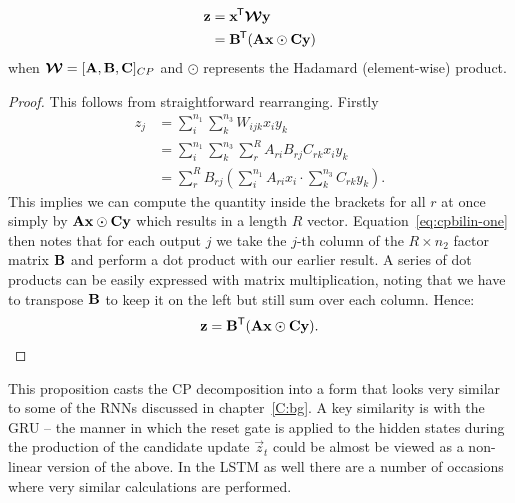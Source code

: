 \begin{prop} \label{prop:cpbilin}
\begin{align}
	\mathbf{z} &= \mathbf{x}^{\mkern-1.5mu\mathsf{T}}\bm{\mathcal{W}}\mathbf{y} \\
			&= \mathbf{B}^{\mkern-1.5mu\mathsf{T}}(\mathbf{A}\mathbf{x} \odot \mathbf{C}\mathbf{y})
\end{align}
when \(\bm{\mathcal{W}} = [\mathbf{A}, \mathbf{B}, \mathbf{C}]_{CP}\) and \(\odot\) represents the Hadamard
(element-wise) product.
\end{prop}
\begin{proof}
This follows from straightforward rearranging. Firstly
\begin{align}
	z_j &= \sum_{i}^{n_1} \sum_k^{n_3} W_{ijk} x_i y_k \\
		&= \sum_{i}^{n_1} \sum_k^{n_3} \sum_r^R A_{ri} B_{rj} C_{rk} x_i y_k\\\label{eq:cpbilin-one}
		&= \sum_r^R B_{rj} \left( \sum_i^{n_1} A_{ri} x_i \cdot \sum_k^{n_3} C_{rk}y_k \right).
\end{align}
This implies we can compute the quantity inside the brackets for all \(r\) at once simply
by \(\mathbf{A}\mathbf{x} \odot \mathbf{C}\mathbf{y}\) which results in a length \(R\) vector. 
Equation~\eqref{eq:cpbilin-one} then notes that for each output \(j\) we take the \(j\)-th column
of the \(R \times n_2\) factor matrix \(\mathbf{B}\) and perform a dot product with our earlier
result. A series of dot products can be easily expressed with matrix multiplication, noting
that we have to transpose \(\mathbf{B}\) to keep it on the left but still sum over each column.
Hence:
\begin{equation}
	\mathbf{z} = \mathbf{B}^\mathsf{T} (\mathbf{A}\mathbf{x} \odot \mathbf{C}\mathbf{y}).
\end{equation}
\end{proof}

This proposition casts the CP decomposition into a form that looks very similar to some of the
RNNs discussed in chapter~\ref{C:bg}. A key similarity is with the GRU -- the manner in which
the reset gate is applied to the hidden states during the production of the candidate update
\(\vec{z}_t\) could be almost be viewed as a non-linear version of the above. In the LSTM as well
there are a number of occasions where very similar calculations are performed.

